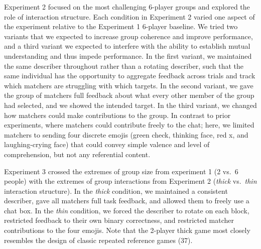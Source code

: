 \documentclass[9pt,twocolumn,twoside]{pnas-new}
\begin{document}
Experiment 2 focused on the most challenging 6-player groups and
explored the role of interaction structure. Each condition in Experiment
2 varied one aspect of the experiment relative to the Experiment 1
6-player baseline. We tried two variants that we expected to increase
group coherence and improve performance, and a third variant we expected
to interfere with the ability to establish mutual understanding and thus
impede performance. In the first variant, we maintained the same
describer throughout rather than a rotating describer, such that the
same individual has the opportunity to aggregate feedback across trials
and track which matchers are struggling with which targets. In the
second variant, we gave the group of matchers full feedback about what
every other member of the group had selected, and we showed the intended
target. In the third variant, we changed how matchers could make
contributions to the group. In contrast to prior experiments, where
matchers could contribute freely to the chat; here, we limited matchers
to sending four discrete emojis (green check, thinking face, red x, and
laughing-crying face) that could convey simple valence and level of
comprehension, but not any referential content.

Experiment 3 crossed the extremes of group size from experiment 1 (2
vs.~6 people) with the extremes of group interactions from Experiment 2
(\emph{thick} vs.~\emph{thin} interaction structure). In the
\emph{thick} condition, we maintained a consistent describer, gave all
matchers full task feedback, and allowed them to freely use a chat box.
In the \emph{thin} condition, we forced the describer to rotate on each
block, restricted feedback to their own binary correctness, and
restricted matcher contributions to the four emojis. Note that the
2-player thick game most closely resembles the design of classic
repeated reference games (37).
\end{document}
